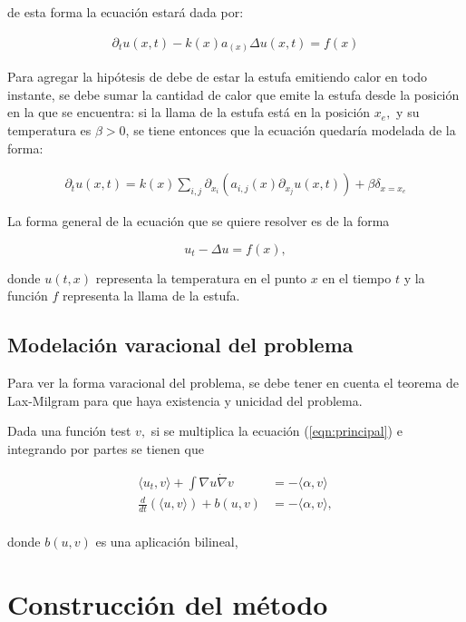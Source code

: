 \documentclass[12pt,paperletter]{article}
\begin{document}
de esta forma la ecuación estará dada por:

\begin{align}
    \label{eqn:gnral simple}
    \partial_t u(x,t) -k(x) a_(x) \Delta u(x,t) = f (x)
\end{align}


Para agregar la hipótesis de debe de estar la estufa emitiendo calor en todo instante, se debe sumar la cantidad de calor que emite la estufa desde la posición en la que se encuentra: si la llama de la estufa está en la posición $x_e,$ y su temperatura es $\beta >0$, se tiene entonces que la ecuación quedaría modelada de la forma:

\begin{align}
    \partial_t u(x,t) = k(x) \sum_{i,j} \partial_{x_i} (a_{i,j} (x) \partial_{x_j} u(x,t) ) + \beta \delta_{x = x_e}
\end{align}


La forma general de la ecuación que se quiere resolver es de la forma 

\begin{equation}
\label{eqn:principal}
u_t - \Delta u = f(x),
\end{equation}
  
donde $u(t,x)$ representa la temperatura en el punto $x$ en el tiempo $t$ y la función $f$ representa la llama de la estufa.   





\subsection{Modelación varacional del problema}
Para ver la forma varacional del problema, se debe tener en cuenta el teorema de Lax-Milgram para que haya existencia y unicidad del problema.

Dada una función test $v, $ si se multiplica la ecuación (\ref{eqn:principal}) e integrando por partes se tienen que 

\begin{align*}
    \langle u_t, v \rangle + \int \nabla u \dot \nabla v   &= - \langle \alpha , v \rangle \\
    \frac{d}{dt} (\langle u, v \rangle)+ b(u,v)&=-\langle \alpha , v \rangle, \\
\end{align*}

donde $b(u,v)$ es una aplicación bilineal, 

\section{Construcción del método}
\end{document}
